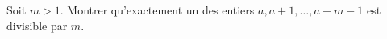 Soit $m > 1$. Montrer qu'exactement un des entiers $a, a + 1, \ldots, a + m - 1$ est divisible par $m$.
